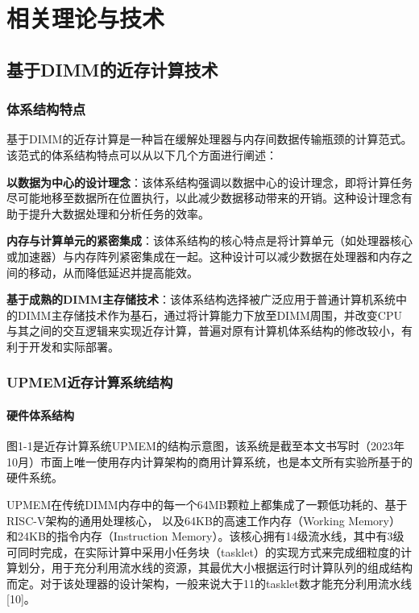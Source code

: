 \chapter{相关理论与技术}\label{chap:Theory_And_Techs}

\section{基于DIMM的近存计算技术}\label{sec:PNM_DIMM_intro}
    \subsection{体系结构特点}\label{subsec:arch_talent_intro}
    基于DIMM的近存计算是一种旨在缓解处理器与内存间数据传输瓶颈的计算范式。该范式的体系结构特点可以从以下几个方面进行阐述：

    \textbf{以数据为中心的设计理念}：该体系结构强调以数据中心的设计理念，即将计算任务尽可能地移至数据所在位置执行，以此减少数据移动带来的开销。这种设计理念有助于提升大数据处理和分析任务的效率。
    
    \textbf{内存与计算单元的紧密集成}：该体系结构的核心特点是将计算单元（如处理器核心或加速器）与内存阵列紧密集成在一起。这种设计可以减少数据在处理器和内存之间的移动，从而降低延迟并提高能效。
    
    \textbf{基于成熟的DIMM主存储技术}：该体系结构选择被广泛应用于普通计算机系统中的DIMM主存储技术作为基石，通过将计算能力下放至DIMM周围，并改变CPU与其之间的交互逻辑来实现近存计算，普遍对原有计算机体系结构的修改较小，有利于开发和实际部署。
    
    \subsection{UPMEM近存计算系统结构}\label{subsec:UPMEM_arch_intro}
        \subsubsection{硬件体系结构}\label{subsubsec:UPMEM_hardware_arch}
        图1-1是近存计算系统UPMEM的结构示意图，该系统是截至本文书写时（2023年10月）市面上唯一使用存内计算架构的商用计算系统，也是本文所有实验所基于的硬件系统。
        
        UPMEM在传统DIMM内存中的每一个64MB颗粒上都集成了一颗低功耗的、基于RISC-V架构的通用处理核心， 以及64KB的高速工作内存（Working Memory） 和24KB的指令内存（Instruction Memory）。该核心拥有14级流水线，其中有3级可同时完成，在实际计算中采用小任务块（tasklet）的实现方式来完成细粒度的计算划分，用于充分利用流水线的资源，其最优大小根据运行时计算队列的组成结构而定。对于该处理器的设计架构，一般来说大于11的tasklet数才能充分利用流水线[10]。
        
